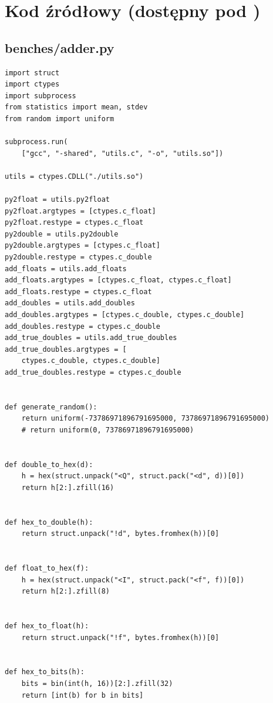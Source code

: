 \documentclass{article}
\begin{document}

\section{Kod źródłowy (dostępny pod \cite{url:github})}

\subsection{benches/adder.py}

\begin{lstlisting}
import struct
import ctypes
import subprocess
from statistics import mean, stdev
from random import uniform

subprocess.run(
    ["gcc", "-shared", "utils.c", "-o", "utils.so"])

utils = ctypes.CDLL("./utils.so")

py2float = utils.py2float
py2float.argtypes = [ctypes.c_float]
py2float.restype = ctypes.c_float
py2double = utils.py2double
py2double.argtypes = [ctypes.c_float]
py2double.restype = ctypes.c_double
add_floats = utils.add_floats
add_floats.argtypes = [ctypes.c_float, ctypes.c_float]
add_floats.restype = ctypes.c_float
add_doubles = utils.add_doubles
add_doubles.argtypes = [ctypes.c_double, ctypes.c_double]
add_doubles.restype = ctypes.c_double
add_true_doubles = utils.add_true_doubles
add_true_doubles.argtypes = [
    ctypes.c_double, ctypes.c_double]
add_true_doubles.restype = ctypes.c_double


def generate_random():
    return uniform(-73786971896791695000, 73786971896791695000)
    # return uniform(0, 73786971896791695000)


def double_to_hex(d):
    h = hex(struct.unpack("<Q", struct.pack("<d", d))[0])
    return h[2:].zfill(16)


def hex_to_double(h):
    return struct.unpack("!d", bytes.fromhex(h))[0]


def float_to_hex(f):
    h = hex(struct.unpack("<I", struct.pack("<f", f))[0])
    return h[2:].zfill(8)


def hex_to_float(h):
    return struct.unpack("!f", bytes.fromhex(h))[0]


def hex_to_bits(h):
    bits = bin(int(h, 16))[2:].zfill(32)
    return [int(b) for b in bits]



\end{lstlisting}
\end{document}
